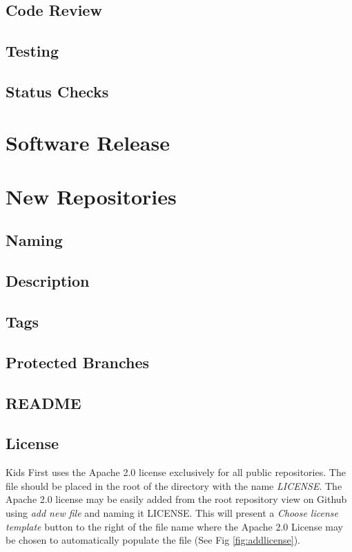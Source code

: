 \documentclass[a4paper,12pt,titlepage]{scrartcl}
\begin{document}
	\subsection{Code Review}
	
	\subsection{Testing}
	
	\subsection{Status Checks}
   
	\section{Software Release}
	
	\section{New Repositories}
	
	\subsection{Naming}
	
	\subsection{Description}
	
	\subsection{Tags}
	
	\subsection{Protected Branches}
	
	\subsection{README}
	
	\subsection{License}
	
	Kids First uses the Apache 2.0 \cite{apache2} license exclusively for all public repositories.
	The file should be placed in the root of the directory with the name {\em LICENSE}.
	The Apache 2.0 license may be easily added from the root repository view on Github using {\em add new file} and naming it LICENSE.
	This will present a {\em Choose license template} button to the right of the file name where the Apache 2.0 License may be chosen to automatically populate the file (See Fig \ref{fig:addlicense}).
	
\end{document}
